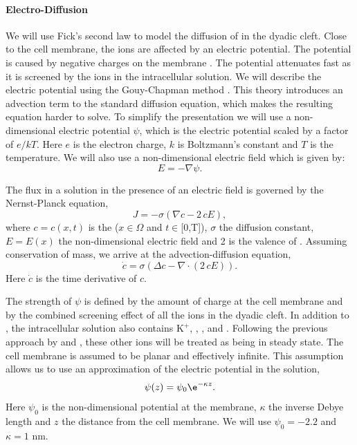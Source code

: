 \paragraph*{Electro-Diffusion}
We will use Fick's second law to model the diffusion of \Ca in the dyadic cleft. Close to the cell membrane, the ions are affected by an electric potential. The potential is caused by negative charges on the membrane \cite{McLaughlinSzaboEisenman1971,LangnerCafisoEtAl1990}. The potential attenuates fast as it is screened by the ions in the intracellular solution. We will describe the electric potential using the Gouy-Chapman method \cite{Grahame1947}. This theory introduces an advection term to the standard diffusion equation, which makes the resulting equation harder to solve. To simplify the presentation we will use a non-dimensional electric potential $\psi$, which is the electric potential scaled by a factor of $e/kT$. Here $e$ is the electron charge, $k$ is Boltzmann's constant and $T$ is the temperature. We will also use a non-dimensional electric field which is given by:
\begin{equation}
  \label{eq:electric_field}
  E=-\nabla\psi.
\end{equation}

The \Ca flux in a solution in the presence of an electric field is governed by the Nernst-Planck equation,
\begin{equation}
  \label{eq:nernst-planck}
  J = -\sigma\left(\nabla c-2\,cE\right),
\end{equation}
where $c = c(x,t)$ is the \CaC ($x\in\Omega$ and $t\in$[0,T]), $\sigma$ the diffusion constant, $E = E(x)$ the non-dimensional electric field and 2 is the valence of \Ca. Assuming conservation of mass, we arrive at the advection-diffusion equation,
\begin{equation}
  \label{eq:advection-diffusion}
  \dot{c}=\sigma\left(\Delta c - \nabla\cdot\left(2\,cE\right)\right).
\end{equation}
Here $\dot{c}$ is the time derivative of $c$.\par

The strength of $\psi$ is defined by the amount of charge at the cell membrane and by the combined screening effect of all the ions in the dyadic cleft. In addition to \Ca, the intracellular solution also contains \ensuremath{\mbox{K}^{+}}, \Na, \Cl, and \Mg. Following the previous approach by \citet{LangnerCafisoMarceljaEtAl1990} and \citet{SoellerCannell1997}, these other ions will be treated as being in steady state. The cell membrane is assumed to be planar and effectively infinite. This assumption allows us to use an approximation of the electric potential in the solution,
\begin{equation}
  \label{eq:electric_potential}
  \psi(z) = \psi_0\e^{-\kappa{}z}.
\end{equation}
Here $\psi_0$ is the non-dimensional potential at the membrane, $\kappa$ the inverse Debye length and $z$ the distance from the cell membrane. We will use $\psi_0=-2.2$ and $\kappa=1$ nm.\par

